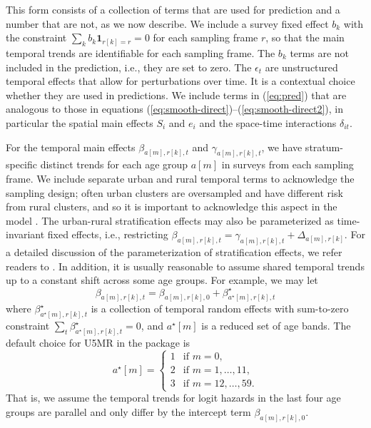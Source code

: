 This form consists of a collection of terms that are used for prediction and a number that are not, as we now describe. We include a survey fixed effect \(b_k\) with the constraint \(\sum_{k} b_k \mathbf{1}_{r[k] = r} = 0\) for each sampling frame \(r\), so that the main temporal trends are identifiable for each sampling frame. The \(b_k\) terms are not included in the prediction, i.e., they are set to zero. The \(\epsilon_t\) are unstructured temporal effects that allow for perturbations over time. It is a contextual choice whether they are used in predictions. We include terms in (\ref{eq:pred}) that are analogous to those in equations (\ref{eq:smooth-direct})--(\ref{eq:smooth-direct2}), in particular the spatial main effects \(S_i\) and \(e_i\) and the space-time interactions \(\delta_{it}\).

For the temporal main effects \(\beta_{a[m],r[k],t}\) and \(\gamma_{a[m],r[k],t}\), we have stratum-specific distinct trends for each age group \(a[m]\) in surveys from each sampling frame. We include separate urban and rural temporal terms to acknowledge the sampling design; often urban clusters are oversampled and have different risk from rural clusters, and so it is important to acknowledge this aspect in the model \citep{paige_etal_20}. The urban-rural stratification effects may also be parameterized as time-invariant fixed effects, i.e., restricting \(\beta_{a[m],r[k],t} = \gamma_{a[m],r[k],t} + \Delta_{a[m],r[k]}\). For a detailed discussion of the parameterization of stratification effects, we refer readers to \citet{wu2021spatial}. In addition, it is usually reasonable to assume shared temporal trends up to a constant shift across some age groups. For example, we may let
\[
    \beta_{a[m],r[k],t} = \beta_{a[m],r[k], 0} + \beta^\star_{a^\star[m], r[k], t}
\]
where \(\beta^\star_{a^\star[m], r[k], t}\) is a collection of temporal random effects with sum-to-zero constraint \(\sum_{t} \beta^\star_{a^\star[m], r[k], t} = 0\), and \(a^\star[m]\) is a reduced set of age bands. The default choice for U5MR in the package is
\begin{equation}
a^\star[m] = \left\{
\begin{array}{ll}
1 & \mbox{if }m=0,\\
2 & \mbox{if }m=1,\dots,11, \\
3 & \mbox{if }m=12,\dots,59.
\end{array}
\right.
\label{eq:astar}
\end{equation}
That is, we assume the temporal trends for logit hazards in the last four age groups are parallel and only differ by the intercept term \(\beta_{a[m],r[k], 0}\).


